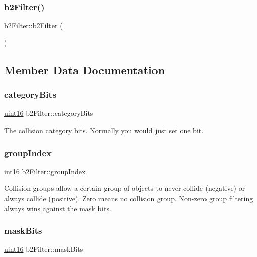 \subsubsection{\texorpdfstring{b2Filter()}{b2Filter()}}
{\footnotesize\ttfamily b2\+Filter\+::b2\+Filter (\begin{DoxyParamCaption}{ }\end{DoxyParamCaption})\hspace{0.3cm}{\ttfamily [inline]}}



\subsection{Member Data Documentation}
\mbox{\label{structb2_filter_a368907397168d39af8b4fc5201d50bba}} 
\subsubsection{\texorpdfstring{categoryBits}{categoryBits}}
{\footnotesize\ttfamily \mbox{\hyperlink{b2_settings_8h_a05f6b0ae8f6a6e135b0e290c25fe0e4e}{uint16}} b2\+Filter\+::category\+Bits}



The collision category bits. Normally you would just set one bit. 

\mbox{\label{structb2_filter_a572a8f4a1672f6d5d71123a35e872950}} 
\subsubsection{\texorpdfstring{groupIndex}{groupIndex}}
{\footnotesize\ttfamily \mbox{\hyperlink{b2_settings_8h_a259fa4834387bd68627ddf37bb3ebdb9}{int16}} b2\+Filter\+::group\+Index}

Collision groups allow a certain group of objects to never collide (negative) or always collide (positive). Zero means no collision group. Non-\/zero group filtering always wins against the mask bits. \mbox{\label{structb2_filter_a533cccf85e3ba3d9e3700d73b819f6e2}} 
\subsubsection{\texorpdfstring{maskBits}{maskBits}}
{\footnotesize\ttfamily \mbox{\hyperlink{b2_settings_8h_a05f6b0ae8f6a6e135b0e290c25fe0e4e}{uint16}} b2\+Filter\+::mask\+Bits}

